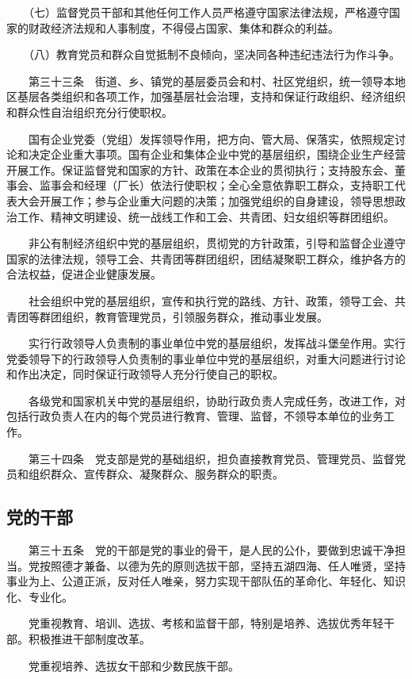 　　（七）监督党员干部和其他任何工作人员严格遵守国家法律法规，严格遵守国家的财政经济法规和人事制度，不得侵占国家、集体和群众的利益。

　　（八）教育党员和群众自觉抵制不良倾向，坚决同各种违纪违法行为作斗争。

　　第三十三条　街道、乡、镇党的基层委员会和村、社区党组织，统一领导本地区基层各类组织和各项工作，加强基层社会治理，支持和保证行政组织、经济组织和群众性自治组织充分行使职权。

　　国有企业党委（党组）发挥领导作用，把方向、管大局、保落实，依照规定讨论和决定企业重大事项。国有企业和集体企业中党的基层组织，围绕企业生产经营开展工作。保证监督党和国家的方针、政策在本企业的贯彻执行；支持股东会、董事会、监事会和经理（厂长）依法行使职权；全心全意依靠职工群众，支持职工代表大会开展工作；参与企业重大问题的决策；加强党组织的自身建设，领导思想政治工作、精神文明建设、统一战线工作和工会、共青团、妇女组织等群团组织。

　　非公有制经济组织中党的基层组织，贯彻党的方针政策，引导和监督企业遵守国家的法律法规，领导工会、共青团等群团组织，团结凝聚职工群众，维护各方的合法权益，促进企业健康发展。

　　社会组织中党的基层组织，宣传和执行党的路线、方针、政策，领导工会、共青团等群团组织，教育管理党员，引领服务群众，推动事业发展。

　　实行行政领导人负责制的事业单位中党的基层组织，发挥战斗堡垒作用。实行党委领导下的行政领导人负责制的事业单位中党的基层组织，对重大问题进行讨论和作出决定，同时保证行政领导人充分行使自己的职权。

　　各级党和国家机关中党的基层组织，协助行政负责人完成任务，改进工作，对包括行政负责人在内的每个党员进行教育、管理、监督，不领导本单位的业务工作。

　　第三十四条　党支部是党的基础组织，担负直接教育党员、管理党员、监督党员和组织群众、宣传群众、凝聚群众、服务群众的职责。

    \subsection{党的干部}
　　第三十五条　党的干部是党的事业的骨干，是人民的公仆，要做到忠诚干净担当。党按照德才兼备、以德为先的原则选拔干部，坚持五湖四海、任人唯贤，坚持事业为上、公道正派，反对任人唯亲，努力实现干部队伍的革命化、年轻化、知识化、专业化。

　　党重视教育、培训、选拔、考核和监督干部，特别是培养、选拔优秀年轻干部。积极推进干部制度改革。

　　党重视培养、选拔女干部和少数民族干部。

